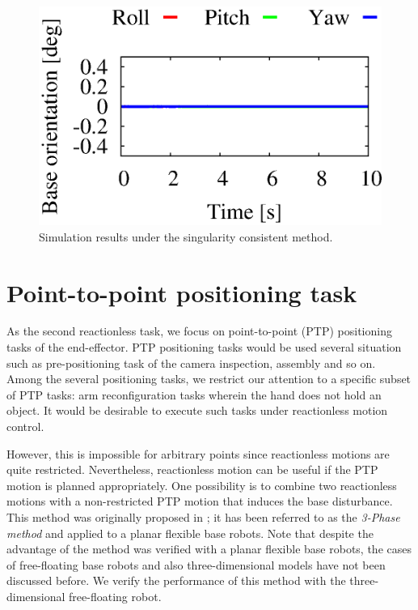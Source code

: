 \begin{figure}[t]
\begin{minipage}[h]{0.40\linewidth}
  \end{minipage}
  \begin{minipage}[h]{0.40\linewidth}
    \centering
    \includegraphics[width=1.0\linewidth]{fig/chapter4/inspection/singularity/SC/X02_Base_Orientation.eps}
  \end{minipage}
  \caption{Simulation results under the singularity consistent method.}
  \label{fig:RES_SC}
\end{figure}
%



\section{Point-to-point positioning task}
As the second reactionless task,
we focus on point-to-point (PTP) positioning tasks of the end-effector.
PTP positioning tasks would be used several situation such as
pre-positioning task of the camera inspection, assembly and so on.
Among the several positioning tasks,
we restrict our attention to a specific subset of PTP tasks:
arm reconfiguration tasks wherein the hand does not hold an object.
It would be desirable to execute such tasks under reactionless motion control.

However,
this is impossible for arbitrary points since reactionless motions are quite restricted.
Nevertheless, reactionless motion can be useful if the PTP motion is planned appropriately.
One possibility is to combine two reactionless motions with a non-restricted PTP motion 
that induces the base disturbance.
This method was originally proposed in \cite{Yoshida1996};
it has been referred to as the \textit{3-Phase method} and
applied to a planar flexible base robots.
Note that despite the advantage of the method was
verified with a planar flexible base robots,
the cases of free-floating base robots and also
three-dimensional models have not been discussed before.
We verify the performance of this method with the three-dimensional free-floating robot.

